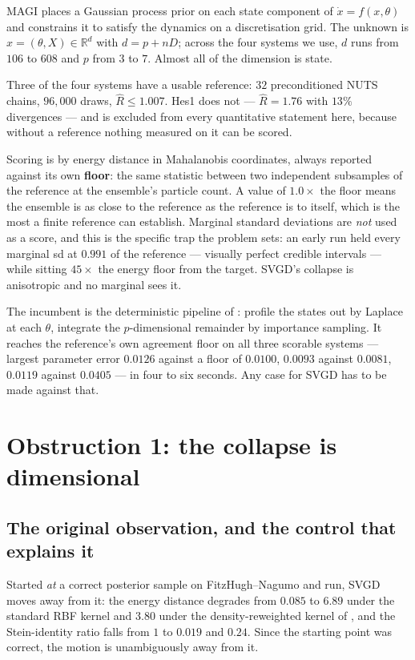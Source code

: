 \documentclass[11pt]{article}
\newcommand{\R}{\mathbb{R}}
\newcommand{\Rhat}{\widehat{R}}
\theoremstyle{remark}
\begin{document}
MAGI places a Gaussian process prior on each state component of $\dot x = f(x,\theta)$ and
constrains it to satisfy the dynamics on a discretisation grid. The unknown is
$x = (\theta, X) \in \R^{d}$ with $d = p + nD$; across the four systems we use, $d$ runs from
$106$ to $608$ and $p$ from $3$ to $7$. Almost all of the dimension is state.

Three of the four systems have a usable reference: $32$ preconditioned NUTS chains, $96{,}000$
draws, $\Rhat \le 1.007$. Hes1 does not --- $\Rhat = 1.76$ with $13\%$ divergences --- and is
excluded from every quantitative statement here, because without a reference nothing measured on it
can be scored.

Scoring is by energy distance in Mahalanobis coordinates, always reported against its own
\textbf{floor}: the same statistic between two independent subsamples of the reference at the
ensemble's particle count. A value of $1.0\times$ the floor means the ensemble is as close to the
reference as the reference is to itself, which is the most a finite reference can establish.
Marginal standard deviations are \emph{not} used as a score, and this is the specific trap the
problem sets: an early run held every marginal sd at $0.991$ of the reference --- visually perfect
credible intervals --- while sitting $45\times$ the energy floor from the target. SVGD's collapse
is anisotropic and no marginal sees it.

The incumbent is the deterministic pipeline of \cite{companion2}: profile the states out by Laplace
at each $\theta$, integrate the $p$-dimensional remainder by importance sampling. It reaches the
reference's own agreement floor on all three scorable systems --- largest parameter error $0.0126$
against a floor of $0.0100$, $0.0093$ against $0.0081$, $0.0119$ against $0.0405$ --- in four to
six seconds. Any case for SVGD has to be made against that.

\section{Obstruction 1: the collapse is dimensional}
\label{sec:dim}

\subsection{The original observation, and the control that explains it}

Started \emph{at} a correct posterior sample on FitzHugh--Nagumo and run, SVGD moves away from it:
the energy distance degrades from $0.085$ to $6.89$ under the standard RBF kernel and $3.80$ under
the density-reweighted kernel of \cite{huang2023}, and the Stein-identity ratio falls from $1$ to
$0.019$ and $0.24$. Since the starting point was correct, the motion is unambiguously away from it.
\end{document}
